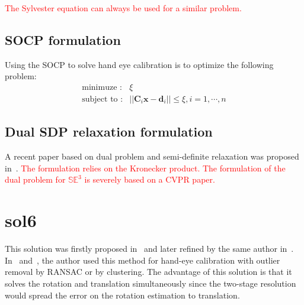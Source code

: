 \documentclass[a4paper]{report}
\begin{document}
\textcolor{red}{The Sylvester equation can always be used for a similar problem.}

\subsection{SOCP formulation}
Using the SOCP to solve hand eye calibration is to optimize the following problem:
\begin{align}
\text{minimuze :}& \xi \\
\text{subject to :}& ||\mathbf{C}_i\mathbf{x}-\mathbf{d}_i|| \leq \xi, \text{$i=1, \cdots, n$} \nonumber
\end{align}

\subsection{Dual SDP relaxation formulation}
A recent paper based on dual problem and semi-definite relaxation was proposed in~\cite{2018_Giamou_Certifiably}. \textcolor{red}{The formulation relies on the Kronecker product. The formulation of the dual problem for $\mathbb{SE}^3$ is severely based on a CVPR paper.}

\section{sol6}
This solution was firstly proposed in~\cite{daniilidis1996dual} and later refined by the same author in~\cite{daniilidis1999hand}. In~\cite{schmidt2003robust} and~\cite{vogt2004vector}, the author used this method for hand-eye calibration with outlier removal by RANSAC or by clustering. The advantage of this solution is that it solves the rotation and translation simultaneously since the two-stage resolution would spread the error on the rotation estimation to translation.
\end{document}
